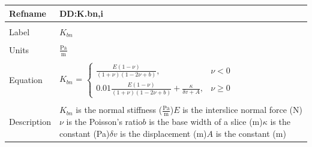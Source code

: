 \documentclass[12pt]{article}
\begin{document}
\noindent \begin{minipage}{\textwidth}
\begin{tabular}{p{} p{}}
\toprule \textbf{Refname} & \textbf{DD:K.bn,i}
\label{DD:K.bn,i}
\\ \midrule \\
Label & $K_{bn}$
\\ \midrule \\
Units & $\frac{\text{Pa}}{\text{m}}$
\\ \midrule \\
Equation & $K_{bn}$ = $\begin{cases}
\frac{E\left(1-\nu{}\right)}{\left(1+\nu{}\right)\left(1-2\nu{}+b\right)}, & \nu{}<0\\
0.01\frac{E\left(1-\nu{}\right)}{\left(1+\nu{}\right)\left(1-2\nu{}+b\right)}+\frac{\kappa{}}{\delta{}v+A}, & \nu{}\geq{}0
\end{cases}$
\\ \midrule \\
Description & $K_{bn}$ is the normal stiffness ($\frac{\text{Pa}}{\text{m}}$)\newline$E$ is the interslice normal force (N)\newline$\nu{}$ is the Poisson's ratio\newline$b$ is the base width of a slice (m)\newline$\kappa{}$ is the constant (Pa)\newline$\delta{}v$ is the displacement (m)\newline$A$ is the constant (m)
\\ \bottomrule \end{tabular}
\end{minipage}\\
\end{document}

